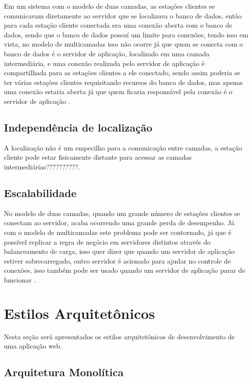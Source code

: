 Em um sistema com o modelo de duas camadas, as estações clientes se comunicavam diretamente ao servidor que se localizava o banco de dados, então para cada estação cliente conectada era uma conexão aberta com o banco de dados, sendo que o banco de dados possuí um limite para conexões, tendo isso em vista, no modelo de multicamadas isso não ocorre já que quem se conecta com o banco de dados é o servidor de aplicação, localizado em uma camada intermediária, e uma conexão realizada pelo servidor de aplicação é compartilhada para as estações clientes a ele conectado, sendo assim poderia se ter várias estações clientes requisitando recursos do banco de dados, mas apenas uma conexão estaria aberta já que quem ficaria responsável pela conexão é o servidor de aplicação \cite{devmediaMultiCamada2018}.

\subsection{Independência de localização}

A localização não é um empecilho para a comunicação entre camadas, a estação cliente pode estar fisicamente distante para acessar as camadas intermediárias??????????.

\subsection{Escalabilidade}

No modelo de duas camadas, quando um grande número de estações clientes se conectam ao servidor, acaba ocorrendo uma grande perda de desempenho. Já com o modelo de multicamadas este problema pode ser contornado, já que é possível replicar a regra de negócio em servidores distintos através do balanceamento de carga, isso quer dizer que quando um servidor de aplicação estiver sobrecarregado, outro servidor é acionado para ajudar no controle de conexões, isso também pode ser usado quando um servidor de aplicação parar de funcionar \cite{devmediaMultiCamada2018}.

\section{Estilos Arquitetônicos}

Nesta seção será apresentados os estilos arquitetônicos de desenvolvimento de uma aplicação web.

\subsection{Arquitetura Monolítica}

